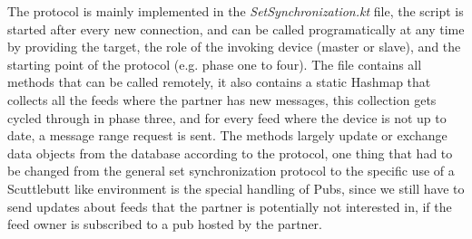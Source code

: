 The protocol is mainly implemented in the \textit{SetSynchronization.kt} file, the script is started after every new connection, and can be called programatically at any time by providing the target, the role of the invoking device (master or slave), and the starting point of the protocol (e.g. phase one to four). The file contains all methods that can be called remotely, it also contains a static Hashmap that collects all the feeds where the partner has new messages, this collection gets cycled through in phase three, and for every feed where the device is not up to date, a message range request is sent. The methods largely update or exchange data objects from the database according to the protocol, one thing that had to be changed from the general set synchronization protocol to the specific use of a Scuttlebutt like environment is the special handling of Pubs, since we still have to send updates about feeds that the partner is potentially not interested in, if the feed owner is subscribed to a pub hosted by the partner.
